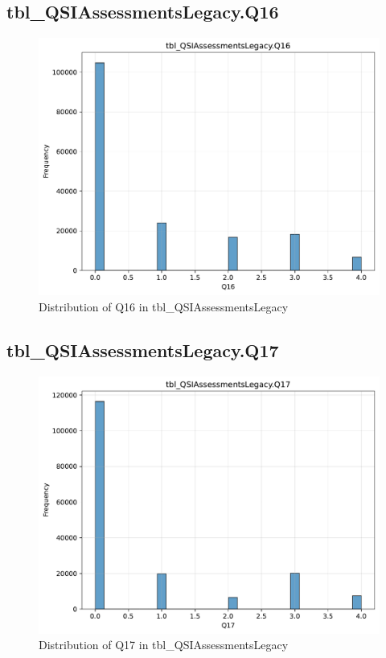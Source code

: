 \subsection{tbl\_QSIAssessmentsLegacy.Q16}

\begin{figure}[htbp]
\centering
\includegraphics[width=\textwidth]{figures/dbo_tbl_QSIAssessmentsLegacy_Q16.pdf}
\caption{Distribution of Q16 in tbl\_QSIAssessmentsLegacy}
\end{figure}\newpage

\subsection{tbl\_QSIAssessmentsLegacy.Q17}

\begin{figure}[htbp]
\centering
\includegraphics[width=\textwidth]{figures/dbo_tbl_QSIAssessmentsLegacy_Q17.pdf}
\caption{Distribution of Q17 in tbl\_QSIAssessmentsLegacy}
\end{figure}\newpage

